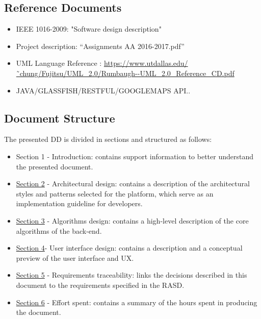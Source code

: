 \subsection{Reference Documents}
\begin{itemize}
		\item IEEE 1016-2009: "Software design description"
		\item Project description: “Assignments AA 2016-2017.pdf”
	
	 	\item UML Language Reference : \url{https://www.utdallas.edu/˜chung/Fujitsu/UML_2.0/Rumbaugh--UML_2.0_Reference_CD.pdf}
	 	\item JAVA/GLASSFISH/RESTFUL/GOOGLEMAPS API..
	\end{itemize}
	

\subsection{Document Structure}
The presented DD is divided in sections and structured as follows:
\begin{itemize}
\item Section 1 - Introduction: contains support information to better understand
the presented document.
\item \hyperref[sec:sec2]{Section 2} - Architectural design: contains a description of the architectural
styles and patterns selected for the platform, which serve as an
implementation guideline for developers.
\item \hyperref[sec:sec3]{Section 3} - Algorithms design: contains a high-level description of the
core algorithms of the back-end.
\item \hyperref[sec:sec4]{Section 4}- User interface design: contains a description and a conceptual
preview of the user interface and UX.
\item \hyperref[sec:sec5]{Section 5} - Requirements traceability: links the decisions described in
this document to the requirements specified in the RASD.
\item \hyperref[sec:sec6]{Section 6} - Effort spent: contains a summary of the hours spent
in producing the document.
\end{itemize}